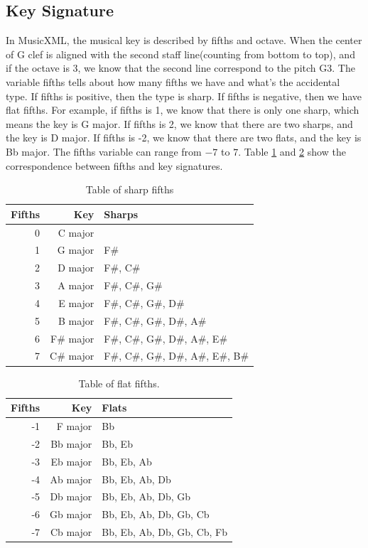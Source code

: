 \subsection{Key Signature}
In MusicXML, the musical key is described by fifths and octave. When the center of G clef is aligned with the second staff line(counting from bottom to top), and if the octave is 3, we know that the second line correspond to the pitch G3. The variable fifths tells about how many fifths we have and what's the accidental type. If fifths is positive, then the type is sharp. If  fifths is negative, then we have flat fifths. For example, if fifths is 1, we know that there is only one sharp, which means the key is G major. If fifths is 2, we know that there are two sharps, and the key is D major. If fifths is -2, we know that there are two flats, and the key is Bb major. The fifths variable can range from $-7$ to $7$. Table \ref{table:fifths-sharp} and \ref{table:fifths-flat}  show the correspondence between fifths and key signatures.

\begin{table}[h]
    \centering
    \begin{tabular}{r|r|l}
        Fifths & Key & Sharps \\
        \hline
        0 & C major &\\
        1 & G major & F\#\\
        2 & D major & F\#, C\#\\
        3 & A major & F\#, C\#, G\#\\
        4 & E major & F\#, C\#, G\#, D\#\\
        5 & B major & F\#, C\#, G\#, D\#, A\#\\
        6 & F\# major & F\#, C\#, G\#, D\#, A\#, E\#\\
        7 & C\# major & F\#, C\#, G\#, D\#, A\#, E\#, B\# \\
    \end{tabular}
    \caption{Table of sharp fifths}
    \label{table:fifths-sharp}
\end{table}

\begin{table}[h]
    \centering
    \begin{tabular}{r|r|l}
        Fifths & Key & Flats\\
        \hline

        -1 & F major & Bb\\
        -2 & Bb major &Bb, Eb\\
        -3 & Eb major &Bb, Eb, Ab\\
        -4 & Ab major &Bb, Eb, Ab, Db\\
        -5 & Db major &Bb, Eb, Ab, Db, Gb\\
        -6 & Gb major &Bb, Eb, Ab, Db, Gb, Cb\\
        -7 & Cb major &Bb, Eb, Ab, Db, Gb, Cb, Fb \\
    \end{tabular}
    \caption{Table of flat fifths.}
    \label{table:fifths-flat}
\end{table}

